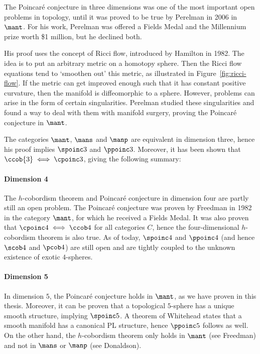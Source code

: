 The Poincaré conjecture in three dimensions was one of the most important open problems in topology, until it was proved to be true by Perelman in 2006 in $\mant$.
For his work, Perelman was offered a Fields Medal and the Millennium prize worth \$1 million, but he declined both.

His proof uses the concept of Ricci flow, introduced by Hamilton in 1982.
The idea is to put an arbitrary metric on a homotopy sphere.
Then the Ricci flow equations tend to `smoothen out' this metric, as illustrated in Figure~\ref{fig:ricci-flow}.
If the metric can get improved enough such that it has constant positive curvature, then the manifold is diffeomorphic to a sphere.
However, problems can arise in the form of certain singularities.
Perelman studied these singularities and found a way to deal with them with manifold surgery, proving the Poincaré conjecture in $\mant$.
\begin{marginfigure}
    \centering
    \caption{An illustration of the the Ricci flow equations.}
    \label{fig:ricci-flow}
\end{marginfigure}
The categories $\mant$,  $\mans$ and  $\manp$ are equivalent in dimension three, hence his proof implies $\spoinc 3$ and  $\ppoinc 3$.
Moreover, it has been shown that $\ccob{3} \iff \cpoinc 3$, giving the following summary:




\paragraph{Dimension 4}
The $h$-cobordism theorem and Poincaré conjecture in dimension four are partly still an open problem.
The Poincaré conjecture was proven by Freedman in 1982 in the category $\mant$, for which he received a Fields Medal.
It was also proven that $\cpoinc 4 \iff \ccob 4$ for all categories $C$, hence the four-dimensional $h$-cobordism theorem is also true.
As of today, $\spoinc 4$ and $\ppoinc 4$ (and hence $\scob 4$ and  $\pcob 4$) are still open and are tightly coupled to the unknown existence of exotic $4$-spheres.



\paragraph{Dimension 5}
In dimension $5$, the  Poincaré conjecture holds in $\mant$, as we have proven in this thesis.
Moreover, it can be proven that a topological $5$-sphere has a unique smooth structure, implying $\spoinc 5$.
A theorem of Whitehead states that a smooth manifold has a canonical PL structure, hence  $\ppoinc 5$ follows as well.
On the other hand, the $h$-cobordism theorem only holds in $\mant$ (see Freedman) and not in $\mans$ or $\manp$ (see Donaldson).



